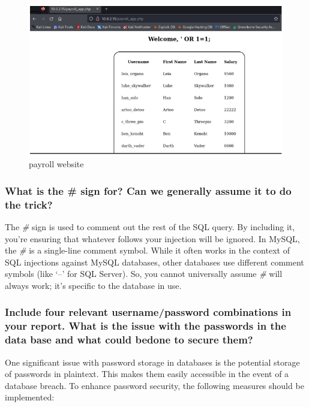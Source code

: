 \begin{figure}[H]
    \centering
    \includegraphics[width=\linewidth]{pic/payroll website.png}
    \caption{payroll website}
    \label{fig:payroll website}
\end{figure}


\subsubsection{What is the \# sign for? Can we generally assume it to do the trick?}
The \textit{\#} sign is used to comment out the rest of the SQL query. By including it, you're
ensuring that whatever follows your injection will be ignored. In MySQL, the \textit{\#} is a
single-line comment symbol. While it often works in the context of SQL injections against
MySQL databases, other databases use different comment symbols (like ‘--’ for SQL
Server). So, you cannot universally assume \textit{\#} will always work; it's specific to the database
in use.


\subsubsection{Include four relevant username/password combinations in your report. What is the issue with the passwords in the data base and what could bedone to secure them?}
One significant issue with password storage in databases is the potential storage of passwords in plaintext.
This makes them easily accessible in the event of a database breach. To enhance password security,
the following measures should be implemented:


